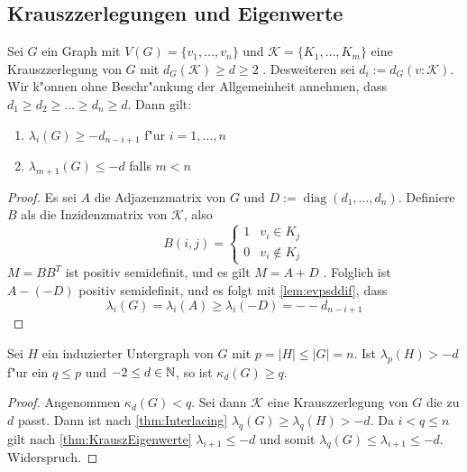 \subsection{Krauszzerlegungen und Eigenwerte}

\begin{theorem}
    \label{thm:KrauszEigenwerte}
    Sei $G$ ein Graph mit $V(G)=\{v_1,\dots,v_n\}$ und $\mathcal K=\{K_1,\dots,K_m\}$ eine Krauszzerlegung von $G$ mit $d_G(\mathcal K) \geq d \geq 2$ . Desweiteren sei $d_i := d_G(v:\mathcal K)$. 
    Wir k"onnen ohne Beschr"ankung der Allgemeinheit annehmen, dass $d_1\geq d_2 \geq \dots \geq d_n \geq d$.
    Dann gilt: 
    \begin{enumerate}[label=(\alph*)]
        \item $\lambda_i(G) \geq -d_{n-i+1}$ f"ur $i = 1, \dots , n$
        \item $\lambda_{m+1}(G) \leq -d$ falls $m < n$
    \end{enumerate}
\end{theorem}
\begin{proof}
    Es sei $A$ die Adjazenzmatrix von $G$ und $D := \operatorname{diag}(d_1,\dots,d_n)$. Definiere $B$ als die Inzidenzmatrix von $\mathcal K$, also $$B(i,j) = \begin{cases}
        1 & v_i \in K_j \\ 0 & v_i \notin K_j
    \end{cases}$$ 
    $M=BB^{T}$ ist positiv semidefinit, und es gilt $M = A+D$ . Folglich ist $A- (-D)$ positiv semidefinit, und es folgt mit \ref{lem:evpsddif}, dass 
    \begin{equation*}
      \lambda_i(G) = \lambda_i(A) \geq \lambda_i(-D) =- -d_{n-i+1}
    \end{equation*}
  \end{proof}
\begin{corollary}
    \label{cor:Korollar1}
    Sei $H$ ein induzierter Untergraph von $G$ mit $p = \left| H\right| \leq \left|G\right| = n$.
    Ist $\lambda_p (H) > -d $ f"ur ein $q \leq p$ und $-2 \leq d \in {\mathbb{N}}$, so ist $\kappa_d(G) \geq q$.
\end{corollary}
\begin{proof}
    Angenommen $\kappa_d(G) < q$. Sei dann $\mathcal{K}$ eine Krauszzerlegung von $G$ die zu $d$ passt. Dann ist nach \ref{thm:Interlacing} $\lambda_{q}(G)\geq \lambda_{q}(H) > -d$. 
    Da $i < q \leq n$ gilt nach \ref{thm:KrauszEigenwerte} $\lambda_{i+1}\leq -d$ und somit $\lambda_{q}(G)\leq \lambda_{i+1} \leq -d$. Widerspruch.
\end{proof}

